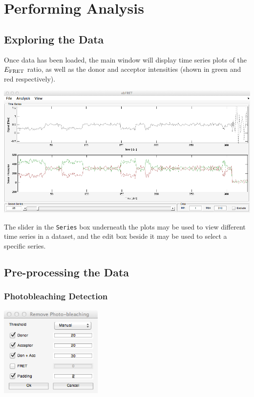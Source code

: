\documentclass[12pt,article,oldfontcommands]{memoir}
\newcommand{\indt}{\qquad}
\begin{document}
\section{Performing Analysis}

\subsection{Exploring the Data}

Once data has been loaded, the main window will display time series plots of the $E_{\rm FRET}$ ratio, as well as the donor and acceptor intensities (shown in green and red respectively).

\indt\includegraphics[width=5.5in]{images/trace_view}

The slider in the \texttt{Series} box underneath the plots may be used to view different time series in a dataset, and the edit box beside it may be used to select a specific series.

\subsection{Pre-processing the Data}

\subsubsection{Photobleaching Detection}

\indt\includegraphics[width=2in]{images/remove_photobleaching_dialog}
\end{document}
